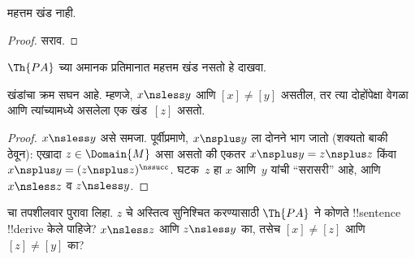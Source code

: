 \documentclass[../../../include/open-logic-section]{subfiles}
\begin{document}
\begin{prop}
महत्तम खंड नाही.
\end{prop}

\begin{proof}
सराव.
\end{proof}

\begin{prob}
$\Th{PA}$ च्या अमानक प्रतिमानात महत्तम खंड नसतो हे दाखवा.
\end{prob}

\begin{prop}
खंडांचा क्रम सघन आहे. म्हणजे, $x \nsless y$ आणि $[x] \neq [y]$ असतील,
तर त्या दोहोंपेक्षा वेगळा आणि त्यांच्यामध्ये असलेला एक खंड~$[z]$ असतो.
\end{prop}

\begin{proof}
$x \nsless y$ असे समजा. पूर्वीप्रमाणे, $x \nsplus y$ ला दोनने भाग जातो
(शक्यतो बाकी ठेवून): एखादा $z \in \Domain{M}$ असा असतो की एकतर
$x \nsplus y = z \nsplus z$ किंवा
$x \nsplus y = (z \nsplus z)^\nssucc$. घटक~$z$ हा $x$ आणि~$y$ यांची
``सरासरी'' आहे, आणि $x \nsless z$ व $z \nsless y$.
\end{proof}

\begin{prob}
 चा तपशीलवार पुरावा लिहा.
$z$ चे अस्तित्व सुनिश्चित करण्यासाठी $\Th{PA}$ ने कोणते !!{sentence}
!!{derive} केले पाहिजे? $x \nsless z$ आणि $z \nsless y$ का, तसेच
$[x] \neq [z]$ आणि $[z] \neq [y]$ का?
\end{prob}
\end{document}
